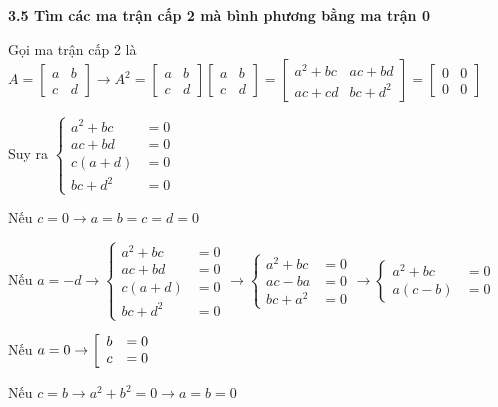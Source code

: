 \textbf{3.5 Tìm các ma trận cấp 2 mà bình phương bằng ma trận 0}

Gọi ma trận cấp 2 là $\displaystyle A=\begin{bmatrix}
a & b\\
c & d
\end{bmatrix}\rightarrow A^{2} =\begin{bmatrix}
a & b\\
c & d
\end{bmatrix}\begin{bmatrix}
a & b\\
c & d
\end{bmatrix} =\begin{bmatrix}
a^{2} +bc & ac+bd\\
ac+cd & bc+d^{2}
\end{bmatrix} =\begin{bmatrix}
0 & 0\\
0 & 0
\end{bmatrix}$

Suy ra $\displaystyle \begin{cases}
a^{2} +bc & =0\\
ac+bd & =0\\
c( a+d) & =0\\
bc+d^{2} & =0
\end{cases}$

Nếu $\displaystyle c=0\rightarrow a=b=c=d=0$

Nếu $\displaystyle a=-d\rightarrow \begin{cases}
a^{2} +bc & =0\\
ac+bd & =0\\
c( a+d) & =0\\
bc+d^{2} & =0
\end{cases}\rightarrow \begin{cases}
a^{2} +bc & =0\\
ac-ba & =0\\
bc+a^{2} & =0
\end{cases}\rightarrow \begin{cases}
a^{2} +bc & =0\\
a( c-b) & =0
\end{cases}$

Nếu $\displaystyle a=0\rightarrow \left[ \begin{array}{l l}
b & =0\\
c & =0
\end{array} \right.$

Nếu $\displaystyle c=b\rightarrow a^{2} +b^{2} =0\rightarrow a=b=0$